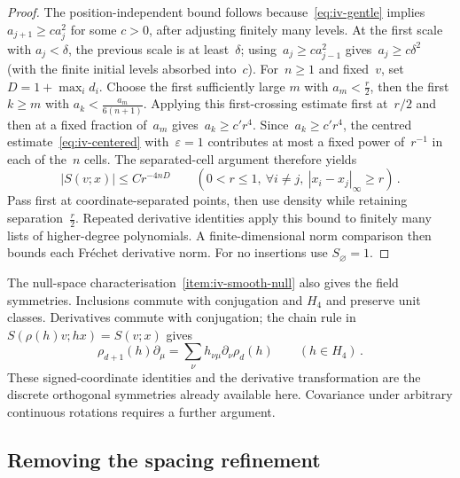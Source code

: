 \begin{proof}
The position-independent bound follows because~\eqref{eq:iv-gentle} implies $a_{j+1}\ge ca_j^2$ for some $c>0$, after adjusting finitely many levels.
At the first scale with $a_j<\delta$, the previous scale is at least~$\delta$; using~$a_j\ge ca_{j-1}^2$ gives~$a_j\ge c\delta^2$ (with the finite initial levels absorbed into~$c$).
For~$n\ge1$ and fixed~$v$, set~$D=1+\max_i d_i$.
Choose the first sufficiently large $m$ with $a_m<\frac{r}{2}$, then the first $k\ge m$ with $a_k<\frac{a_m}{6(n+1)}$.
Applying this first-crossing estimate first at~$r/2$ and then at a fixed fraction of~$a_m$ gives~$a_k\ge c'r^4$.
Since~$a_k\ge c'r^4$, the centred estimate~\eqref{eq:iv-centered} with~$\varepsilon=1$ contributes at most a fixed power of~$r^{-1}$ in each of the~$n$ cells. The separated-cell argument therefore yields
\begin{equation*}
|S(v;x)|\le Cr^{-4nD}\qquad
(0<r\le1,\ \forall i\ne j,\ |x_i-x_j|_\infty\ge r)\,.
\end{equation*}
Pass first at coordinate-separated points, then use density while retaining separation~$\frac{r}{2}$.
Repeated derivative identities apply this bound to finitely many lists of higher-degree polynomials.
A finite-dimensional norm comparison then bounds each Fr\'echet derivative norm.
For no insertions use $S_{\varnothing}=1$.
\end{proof}

The null-space characterisation~\ref{item:iv-smooth-null} also gives the field symmetries.
Inclusions commute with conjugation and $H_4$ and preserve unit classes.
Derivatives commute with conjugation; the chain rule in $S(\rho(h)v;hx)=S(v;x)$ gives
\begin{equation*}
\rho_{d+1}(h)\partial_\mu=\sum_\nu h_{\nu\mu}\partial_\nu\rho_d(h)\qquad(h\in H_4)\,.
\end{equation*}
These signed-coordinate identities and the derivative transformation are the discrete orthogonal symmetries already available here. Covariance under arbitrary continuous rotations requires a further argument.

\subsection{Removing the spacing refinement}\label{subsec:iv-full-spacing}

